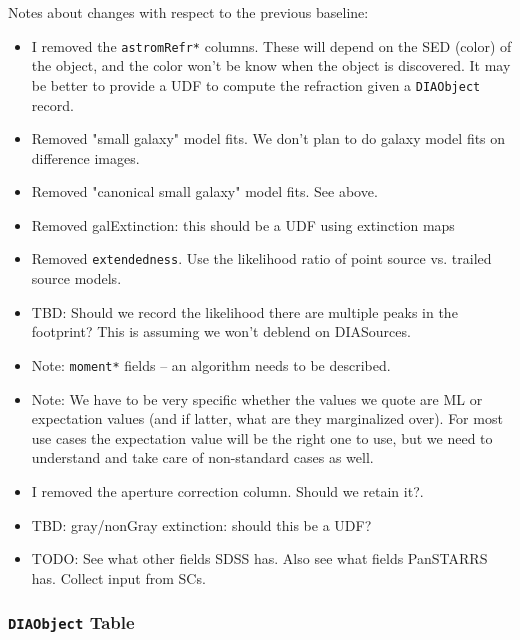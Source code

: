 \documentclass[12pt]{article}
\newcommand{\code}[1]{\texttt{#1}}
\newcommand{\DIAObject}{\code{DIAObject}\xspace}
\begin{document}
Notes about changes with respect to the previous baseline:
\begin{itemize}
\item I removed the \texttt{astromRefr*} columns. These will depend on the SED (color) of the object, and the color won't be know when the object is discovered. It may be better to provide a UDF to compute the refraction given a \DIAObject record.
\item Removed "small galaxy" model fits. We don't plan to do galaxy model fits on difference images.
\item Removed "canonical small galaxy" model fits. See above.
\item Removed galExtinction: this should be a UDF using extinction maps
\item Removed \texttt{extendedness}. Use the likelihood ratio of point source vs. trailed source models.
\item TBD: Should we record the likelihood there are multiple peaks in the footprint? This is assuming we won't deblend on DIASources.
\item Note: \texttt{moment*} fields -- an algorithm needs to be described.
\item Note: We have to be very specific whether the values we quote are ML or expectation values (and if latter, what are they marginalized over). For most use cases the expectation value will be the right one to use, but we need to understand and take care of non-standard cases as well.
\item I removed the aperture correction column. Should we retain it?.
\item TBD: gray/nonGray extinction: should this be a UDF?
\item TODO: See what other fields SDSS has. Also see what fields PanSTARRS has. Collect input from SCs.
\end{itemize}


\subsubsection{\DIAObject Table}
\end{document}
